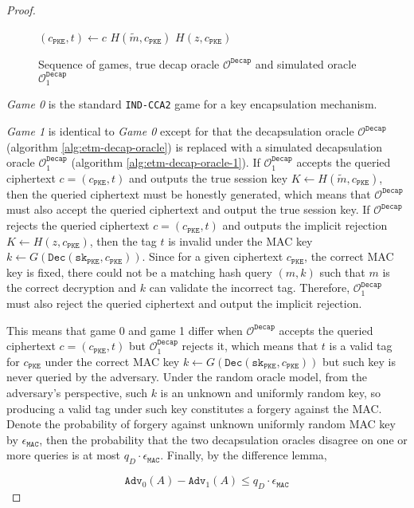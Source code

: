 \documentclass[floatrow,journal=tches,submission]{iacrtrans}
\newcommand{\pke}{\texttt{PKE}}
\newcommand{\decrypt}{\texttt{Dec}}
\newcommand{\decap}{\texttt{Decap}}
\newcommand{\mac}{\texttt{MAC}}
\newcommand{\sk}{\texttt{sk}}
\begin{document}
\begin{proof}
\begin{figure}[H]
\begin{algorithm}[H]
            \caption{$\mathcal{O}^\decap_1(c)$}\label{alg:etm-decap-oracle-1}
            \begin{algorithmic}[1]
                \State $(c_\pke, t) \leftarrow c$
                \If{$\exists (\tilde{m}, \tilde{k}) \in \mathcal{L}^G 
                    : \decrypt(\sk_\pke, c_\pke) = \tilde{m} 
                    \land \mac(\tilde{k}, c_\pke) = t$}
                    \State \Return $H(\tilde{m}, c_\pke)$
                \EndIf
                \State \Return $H(z, c_\pke)$
            \end{algorithmic}
        \end{algorithm}
        \caption{Sequence of games, true decap oracle $\mathcal{O}^\decap$ and simulated oracle $\mathcal{O}^\decap_1$}\label{fig:sequence-of-games}
    \end{figure}

    \emph{Game 0} is the standard \texttt{IND-CCA2} game for a key encapsulation mechanism.

    \emph{Game 1} is identical to \emph{Game 0} except for that the decapsulation oracle $\mathcal{O}^\decap$ (algorithm \ref{alg:etm-decap-oracle}) is replaced with a simulated decapsulation oracle $\mathcal{O}^\decap_1$ (algorithm \ref{alg:etm-decap-oracle-1}). If $\mathcal{O}^\decap_1$ accepts the queried ciphertext $c = (c_\pke, t)$ and outputs the true session key $K \leftarrow H(\tilde{m}, c_\pke)$, then the queried ciphertext must be honestly generated, which means that $\mathcal{O}^\decap$ must also accept the queried ciphertext and output the true session key. If $\mathcal{O}^\decap$ rejects the queried ciphertext $c = (c_\pke, t)$ and outputs the implicit rejection $K \leftarrow H(z, c_\pke)$, then the tag $t$ is invalid under the MAC key $k \leftarrow G(\decrypt(\sk_\pke, c_\pke))$. Since for a given ciphertext $c_\pke$, the correct MAC key is fixed, there could not be a matching hash query $(m, k)$ such that $m$ is the correct decryption and $k$ can validate the incorrect tag. Therefore, $\mathcal{O}^\decap_1$ must also reject the queried ciphertext and output the implicit rejection.

    This means that game 0 and game 1 differ when $\mathcal{O}^\decap$ accepts the queried ciphertext $c = (c_\pke, t)$ but $\mathcal{O}^\decap_1$ rejects it, which means that $t$ is a valid tag for $c_\pke$ under the correct MAC key $k \leftarrow G(\decrypt(\sk_\pke, c_\pke))$ but such key is never queried by the adversary. Under the random oracle model, from the adversary's perspective, such $k$ is an unknown and uniformly random key, so producing a valid tag under such key constitutes a forgery against the MAC. Denote the probability of forgery against unknown uniformly random MAC key by $\epsilon_\mac$, then the probability that the two decapsulation oracles disagree on one or more queries is at most $q_D \cdot \epsilon_\mac$. Finally, by the difference lemma,

    \begin{equation*}
        \texttt{Adv}_0(A) - \texttt{Adv}_1(A) \leq q_D \cdot \epsilon_\mac
    \end{equation*}


\end{proof}
\end{document}
